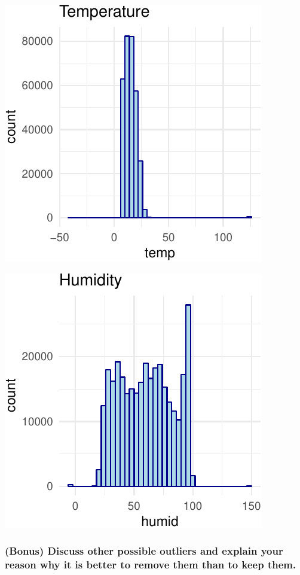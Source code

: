 \documentclass[]{article}
\begin{document}
\begin{center}\includegraphics{Project1WriteUp_files/figure-latex/unnamed-chunk-9-2} \end{center}

\begin{center}\includegraphics{Project1WriteUp_files/figure-latex/unnamed-chunk-9-3} \end{center}

\subsubsection{(Bonus) Discuss other possible outliers and explain your
reason why it is better to remove them than to keep
them.}\label{bonus-discuss-other-possible-outliers-and-explain-your-reason-why-it-is-better-to-remove-them-than-to-keep-them.}
\end{document}
